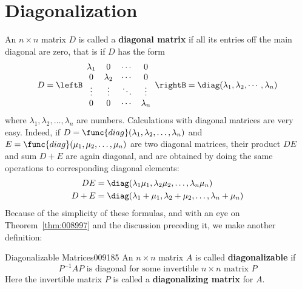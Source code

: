 \section{Diagonalization}\label{sec:3_4}

An $n \times n$ matrix $D$ is called a \textbf{diagonal matrix} if all its entries off the main diagonal are zero, that is if $D$ has the form
\begin{equation*}
D = \leftB \begin{array}{cccc}
\lambda_1 & 0 & \cdots & 0 \\
0 & \lambda_2 & \cdots & 0 \\
\vdots & \vdots & \ddots & \vdots \\
0 & 0 & \cdots & \lambda_n \end{array}\rightB = \diag(\lambda_1, \lambda_2, \cdots, \lambda_n)
\end{equation*}
where $\lambda_{1}, \lambda_{2}, \dots , \lambda_{n}$ are numbers. Calculations with diagonal matrices are very easy. Indeed, if \newline$D = \func{diag}(\lambda_{1}, \lambda_{2}, \dots , \lambda_{n})$ and $E = \func{diag}(\mu_{1}, \mu_{2}, \dots , \mu_{n})$ are two diagonal matrices, their product $DE$ and sum $D + E$ are again diagonal, and are obtained by doing the same operations to corresponding diagonal elements:
\begin{align*}
DE &= \diag(\lambda_1 \mu_1, \lambda_2 \mu_2, \dots, \lambda_n \mu_n) \\
D + E &= \diag(\lambda_1 + \mu_1, \lambda_2 + \mu_2, \dots, \lambda_n + \mu_n)
\end{align*}
Because of the simplicity of these formulas, and with an eye on Theorem~\ref{thm:008997} and the discussion preceding it, we make another definition:


\begin{definition}{Diagonalizable Matrices}{009185}
An $n \times n$ matrix $A$ is called \textbf{diagonalizable} if
\begin{equation*}
P^{-1}AP \mbox{ is diagonal for some invertible } n \times n \mbox{ matrix } P
\end{equation*}
Here the invertible matrix $P$ is called a \textbf{diagonalizing matrix} for $A$.
\end{definition}

